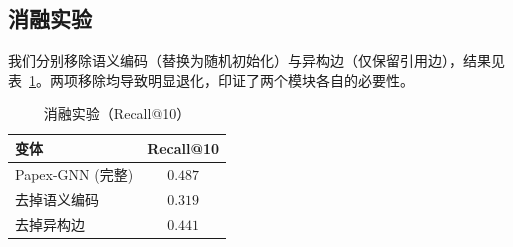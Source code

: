 \subsection{消融实验}
我们分别移除语义编码（替换为随机初始化）与异构边（仅保留引用边），结果见表~\ref{tab:ablation}。两项移除均导致明显退化，印证了两个模块各自的必要性。

\begin{table}[htbp]
  \centering
  \caption{消融实验（Recall@10）}
  \label{tab:ablation}
  \begin{tabular}{lc}
    \toprule
    变体 & Recall@10 \\
    \midrule
    Papex-GNN (完整)          & $0.487$ \\
    \quad 去掉语义编码        & $0.319$ \\
    \quad 去掉异构边          & $0.441$ \\
    \bottomrule
  \end{tabular}
\end{table}
